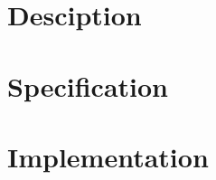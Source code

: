 \documentclass[10pt,a4paper]{article}
\begin{document}
\tableofcontents
\newpage
\listoffigures
\newpage
\listoftables
\newpage
{}


\chapter{Desciption}

\chapter{Specification}

\chapter{Implementation}
\end{document}
